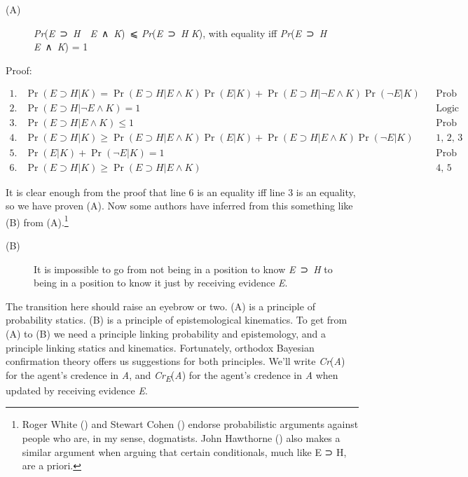 \documentclass[
  10pt,
  letterpaper,
  DIV=11,
  numbers=noendperiod,
  twoside]{scrartcl}
\begin{document}
\begin{description}
\item[(A)]
\emph{Pr}(\emph{E}~⊃~\emph{H}~\textbar~\emph{E}~∧~\emph{K})~⩽
\emph{Pr}(\emph{E}~⊃~\emph{H} \textbar{} \emph{K}), with equality iff
\emph{Pr}(\emph{E}~⊃~\emph{H} \textbar{} \emph{E}~∧~\emph{K}) = 1
\end{description}

Proof:

\[
\begin{aligned}
1. & \Pr(E \supset H | K) = \Pr(E \supset H | E \wedge K)\Pr(E | K) + \Pr(E \supset H | \neg E \wedge K)\Pr(\neg E | K) &&  \text{Prob theorem} \\
2. & \Pr(E \supset H | \neg E \wedge K) = 1 && \text{Logic} \\
3. & \Pr(E \supset H | E \wedge K) \leq 1  && \text{Prob theorem} \\
4. & \Pr(E \supset H | K)  \geq \Pr(E \supset H | E \wedge K)\Pr(E | K) + \Pr(E \supset H | E \wedge K)\Pr(\neg E | K)  && \text{1, 2, 3} \\
5. & \Pr(E | K) + \Pr(\neg E | K) = 1  && \text{Prob theorem} \\
6. & \Pr(E \supset H | K) \geq \Pr(E \supset H | E \wedge K) && \text{4, 5}
\end{aligned}
\]

It is clear enough from the proof that line 6 is an equality iff line 3
is an equality, so we have proven (A). Now some authors have inferred
from this something like (B) from (A).\footnote{Roger White
  () and Stewart Cohen
  () endorse probabilistic arguments
  against people who are, in my sense, dogmatists. John Hawthorne
  () also makes a similar argument
  when arguing that certain conditionals, much like E ⊃ H, are a priori.}

\begin{description}
\item[(B)]
It is impossible to go from not being in a position to know
\emph{E}~⊃~\emph{H} to being in a position to know it just by receiving
evidence \emph{E}.
\end{description}

The transition here should raise an eyebrow or two. (A) is a principle
of probability statics. (B) is a principle of epistemological
kinematics. To get from (A) to (B) we need a principle linking
probability and epistemology, and a principle linking statics and
kinematics. Fortunately, orthodox Bayesian confirmation theory offers us
suggestions for both principles. We'll write \emph{Cr}(\emph{A}) for the
agent's credence in \emph{A}, and \emph{Cr\textsubscript{E}}(\emph{A})
for the agent's credence in \emph{A} when updated by receiving evidence
\emph{E}.
\end{document}
